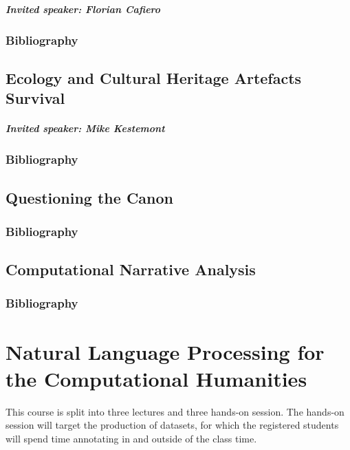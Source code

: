 \documentclass{report}
\begin{document}
\paragraph{Invited speaker: Florian Cafiero}

\subsection*{Bibliography}

\section{Ecology and Cultural Heritage Artefacts Survival}

\paragraph{Invited speaker: Mike Kestemont}

\subsection*{Bibliography}

\section{Questioning the Canon}

\subsection*{Bibliography}

\section{Computational Narrative Analysis}

\subsection*{Bibliography}

\cite{haussler2023operationalizing}


\chapter{Natural Language Processing for the Computational Humanities}

This course is split into three lectures and three hands-on session. The hands-on session will target the production of datasets, for which the registered students will spend time annotating in and outside of the class time.
\end{document}
